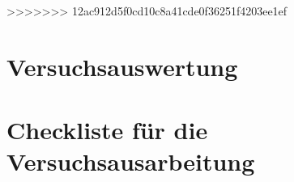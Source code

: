 \documentclass{article}
\begin{document}
			
>>>>>>> 12ac912d5f0cd10c8a41cde0f36251f4203ee1ef
	\section{Versuchsauswertung}
	
	\section{Checkliste für die Versuchsausarbeitung}
	
	\newpage
	\printbibliography %
\end{document}
